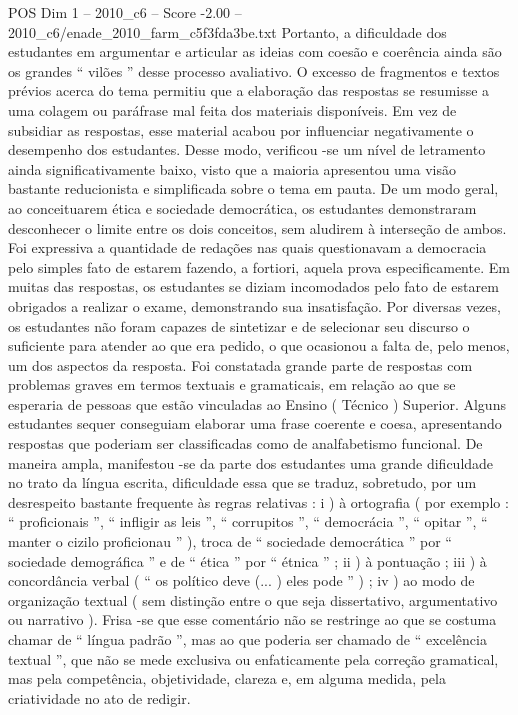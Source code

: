 \begin{textsample}{POS Dim 1 – 2010\_c6 – Score -2.00 – 2010\_c6/enade\_2010\_farm\_c5f3fda3be.txt}
Portanto, a dificuldade dos estudantes em argumentar e articular as ideias com coesão e coerência ainda são os grandes “ vilões ” desse processo avaliativo.
O excesso de fragmentos e textos prévios acerca do tema permitiu que a elaboração das respostas se resumisse a uma colagem ou paráfrase mal feita dos materiais disponíveis.
Em vez de subsidiar as respostas, esse material acabou por influenciar negativamente o desempenho dos estudantes.
Desse modo, verificou -se um nível de letramento ainda significativamente baixo, visto que a maioria apresentou uma visão bastante reducionista e simplificada sobre o tema em pauta.
De um modo geral, ao conceituarem ética e sociedade democrática, os estudantes demonstraram desconhecer o limite entre os dois conceitos, sem aludirem à interseção de ambos.
Foi expressiva a quantidade de redações nas quais questionavam a democracia pelo simples fato de estarem fazendo, a fortiori, aquela prova especificamente.
Em muitas das respostas, os estudantes se diziam incomodados pelo fato de estarem obrigados a realizar o exame, demonstrando sua insatisfação.
Por diversas vezes, os estudantes não foram capazes de sintetizar e de selecionar seu discurso o suficiente para atender ao que era pedido, o que ocasionou a falta de, pelo menos, um dos aspectos da resposta.
Foi constatada grande parte de respostas com problemas graves em termos textuais e gramaticais, em relação ao que se esperaria de pessoas que estão vinculadas ao Ensino ( Técnico ) Superior.
Alguns estudantes sequer conseguiam elaborar uma frase coerente e coesa, apresentando respostas que poderiam ser classificadas como de analfabetismo funcional.
De maneira ampla, manifestou -se da parte dos estudantes uma grande dificuldade no trato da língua escrita, dificuldade essa que se traduz, sobretudo, por um desrespeito bastante frequente às regras relativas : i ) à ortografia ( por exemplo : “ proficionais ”, “ infligir as leis ”, “ corrupitos ”, “ democrácia ”, “ opitar ”, “ manter o cizilo proficionau ” ), troca de “ sociedade democrática ” por “ sociedade demográfica ” e de “ ética ” por “ étnica ” ; ii ) à pontuação ; iii ) à concordância verbal ( “ os político deve (... ) eles pode ” ) ; iv ) ao modo de organização textual ( sem distinção entre o que seja dissertativo, argumentativo ou narrativo ).
Frisa -se que esse comentário não se restringe ao que se costuma chamar de “ língua padrão ”, mas ao que poderia ser chamado de “ excelência textual ”, que não se mede exclusiva ou enfaticamente pela correção gramatical, mas pela competência, objetividade, clareza e, em alguma medida, pela criatividade no ato de redigir.

\end{textsample}

